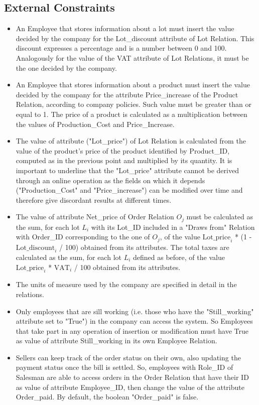 \subsection{External Constraints}
\begin{itemize}
\item An Employee that stores information about a lot must insert the value decided by the company for the Lot\_discount attribute of Lot Relation. This discount expresses a percentage and is a number between 0 and 100. Analogously for the value of the VAT attribute of Lot Relations, it must be the one decided by the company.
\item An Employee that stores information about a product must insert the value decided by the company for the attribute Price\_increase of the Product Relation, according to company policies. Such value must be greater than or equal to 1. The price of a product is calculated as a multiplication between the values of Production\_Cost and Price\_Increase.
\item The value of attribute ("Lot\_price") of Lot Relation is calculated from the value of the product's price of the product identified by Product\_ID, computed as in the previous point and multiplied by its quantity. It is important to underline that the "Lot\_price" attribute cannot be derived through an online operation as the fields on which it depends ("Production\_Cost" and "Price\_increase") can be modified over time and therefore give discordant results at different times.
\item The value of attribute Net\_price of Order Relation $O_j$ must be calculated as the sum, for each lot $L_i$ with its Lot\_ID included in a "Draws from" Relation with Order\_ID corresponding to the one of $O_j$, of the value $ \mathrm{Lot\_price}_i $ * (1 - $ \mathrm{Lot\_discount}_i $ / 100) obtained from its attributes. The total taxes are calculated as the sum, for each lot $L_i$ defined as before, of the value $ \mathrm{Lot\_price}_i $ * $ \mathrm{VAT}_i $ / 100 obtained from its attributes.
\item The units of measure used by the company are specified in detail in the relations.
\item Only employees that are sill working (i.e. those who have the "Still\_working" attribute set to "True") in the company can access the system. So Employees that take part in any operation of insertion or modification must have True as value of attribute Still\_working in its own Employee Relation.
\item Sellers can keep track of the order status on their own, also updating the payment status once the bill is settled. So, employees with Role\_ID of Salesman are able to access orders in the Order Relation that have their ID as value of attribute Employee\_ID, then change the value of the attribute Order\_paid. By default, the boolean "Order\_paid" is false.

\end{itemize}
